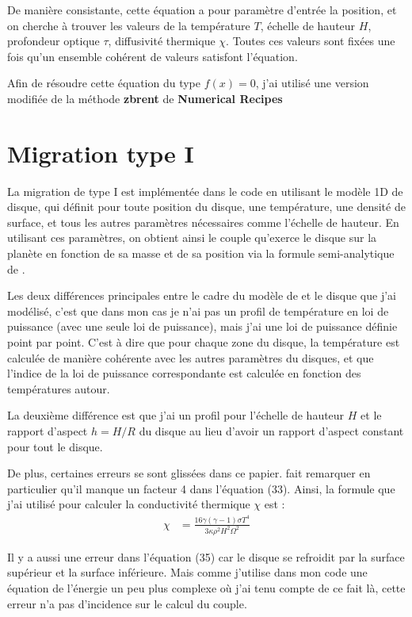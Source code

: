 De manière consistante, cette équation a pour paramètre d'entrée la position, et on cherche à trouver les valeurs de la température $T$, échelle de hauteur $H$, profondeur optique $\tau$, diffusivité thermique $\chi$. Toutes ces valeurs sont fixées une fois qu'un ensemble cohérent de valeurs satisfont l'équation.

Afin de résoudre cette équation du type $f(x)=0$, j'ai utilisé une version modifiée de la méthode \textbf{zbrent} de \textbf{Numerical Recipes} \citep{press1992numerical}

\section{Migration type I}
La migration de type I est implémentée dans le code en utilisant le modèle 1D de disque, qui définit pour toute position du disque, une température, une densité de surface, et tous les autres paramètres nécessaires comme l'échelle de hauteur. En utilisant ces paramètres, on obtient ainsi le couple qu'exerce le disque sur la planète en fonction de sa masse et de sa position via la formule semi-analytique de \cite{paardekooper2011torque}. 

Les deux différences principales entre le cadre du modèle de \cite{paardekooper2011torque} et le disque que j'ai modélisé, c'est que dans mon cas je n'ai pas un profil de température en loi de puissance (avec une seule loi de puissance), mais j'ai une loi de puissance définie point par point. C'est à dire que pour chaque zone du disque, la température est calculée de manière cohérente avec les autres paramètres du disques, et que l'indice de la loi de puissance correspondante est calculée en fonction des températures autour.

La deuxième différence est que j'ai un profil pour l'échelle de hauteur $H$ et le rapport d'aspect $h=H/R$ du disque au lieu d'avoir un rapport d'aspect constant pour tout le disque.

\bigskip

De plus, certaines erreurs se sont glissées dans ce papier. \cite[appendice A]{bitsch2011range} fait remarquer en particulier qu'il manque un facteur 4 dans l'équation (33). Ainsi, la formule que j'ai utilisé pour calculer la conductivité thermique $\chi$ est :
\begin{align}
\chi &= \frac{16\gamma (\gamma-1) \sigma T^4}{3\kappa \rho^2 H^2\Omega^2}
\end{align}

Il y a aussi une erreur dans l'équation (35) car le disque se refroidit par la surface supérieur et la surface inférieure. Mais comme j'utilise dans mon code une équation de l'énergie  un peu plus complexe où j'ai tenu compte de ce fait là, cette erreur n'a pas d'incidence sur le calcul du couple.

